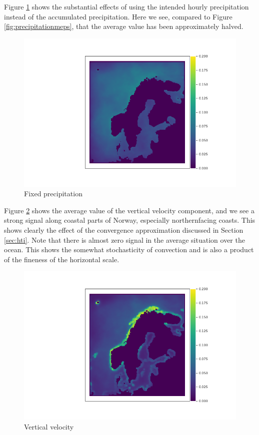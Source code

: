 Figure \ref{fig:precipitationfixmeps} shows the substantial effects of using the intended hourly precipitation instead of the accumulated precipitation. Here we see, compared to Figure \ref{fig:precipitationmeps}, that the average value has been approximately halved.

\begin{figure}
    \centering
    \includegraphics[width = \textwidth]{Figures/Pf.png}
    \caption{Fixed precipitation}
    \label{fig:precipitationfixmeps}
\end{figure}

Figure \ref{fig:upwardvelocitymeps} shows the average value of the vertical velocity component, and we see a strong signal along coastal parts of Norway, especially northernfacing coasts. This shows clearly the effect of the convergence approximation discussed in Section \ref{sec:hti}. Note that there is almost zero signal in the average situation over the ocean. This shows the somewhat stochasticity of convection and is also a product of the fineness of the horizontal scale. 

\begin{figure}
    \centering
    \includegraphics[width = \textwidth]{Figures/W.png}
    \caption{Vertical velocity}
    \label{fig:upwardvelocitymeps}
\end{figure}

